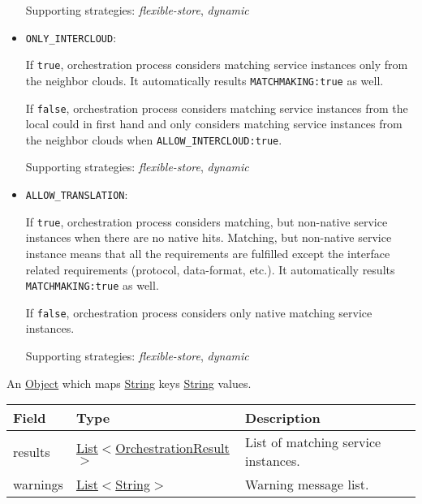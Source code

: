 \documentclass[a4paper]{arrowhead}
\newcommand{\pref}[1]{{\textcolor{ArrowheadGrey}{\hyperref[sec:model:primitives:#1]{#1}}}}
\begin{document}
\begin{itemize}
    Supporting strategies: \textit{flexible-store}, \textit{dynamic}

    \item \texttt{ONLY\_INTERCLOUD}:

    If \texttt{true}, orchestration process considers matching service instances only from the neighbor clouds. It automatically results \texttt{MATCHMAKING:true} as well.

    If \texttt{false}, orchestration process considers matching service instances from the local could in first hand and only considers matching service instances from the neighbor clouds when \texttt{ALLOW\_INTERCLOUD:true}.

    Supporting strategies: \textit{flexible-store}, \textit{dynamic}
    
    \item \texttt{ALLOW\_TRANSLATION}:

    If \texttt{true}, orchestration process considers matching, but non-native service instances when there are no native hits. Matching, but non-native service instance means that all the requirements are fulfilled except the interface related requirements (protocol, data-format, etc.). It automatically results \texttt{MATCHMAKING:true} as well.

     If \texttt{false}, orchestration process considers only native matching service instances.

     Supporting strategies: \textit{flexible-store}, \textit{dynamic}
    
\end{itemize}


An \pref{Object} which maps \pref{String} keys \pref{String} values.

 
\begin{table}[ht!]
\begin{tabularx}{\textwidth}{| p{3cm} | p{4.25cm} | X |} \hline
\rowcolor{gray!33} Field & Type & Description \\ \hline
results & \pref{List}$<$\hyperref[sec:model:OrchestrationResult]{OrchestrationResult}$>$ & List of matching service instances. \\ \hline
warnings & \pref{List}$<$\hyperref[sec:model:String]{String}$>$ & Warning message list. \\ \hline
\end{tabularx}
\end{table}
\end{document}
